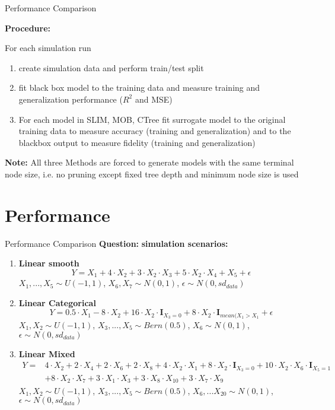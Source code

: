 \documentclass[9pt, xcolor=table]{beamer}
\begin{document}
\begin{frame}{Performance Comparison}


\textbf{Procedure:} 

For each simulation run
\begin{enumerate}
    \item create simulation data and perform train/test split
    \item fit black box model to the training data and measure training and generalization performance ($R^2$ and MSE)
    \item For each model in SLIM, MOB, CTree fit surrogate model to the original training data to measure accuracy (training and generalization) and to the blackbox output to measure fidelity (training and generalization)
\end{enumerate}

\textbf{Note:} All three Methods are forced to generate models with the same terminal node size, i.e. no pruning except fixed tree depth and minimum node size is used

\end{frame}

\section{Performance}
\begin{frame}{Performance Comparison}
\textbf{Question:} 
\textbf{simulation scenarios:}
\begin{enumerate}
    \item \textbf{Linear smooth} $$ Y = X_1 + 4 \cdot X_2 + 3 \cdot X_2 \cdot X_3 + 5\cdot X_2\cdot X_4 + X_5 + \epsilon $$
    $X_1,..., X_5 \sim U(-1,1)$, $X_6, X_7 \sim N(0,1)$, $\epsilon \sim N(0, sd_{data})$
    
    \item \textbf{Linear Categorical} $$ Y =  0.5\cdot X_{1} - 8\cdot X_2 + 16\cdot X_2\cdot \mathbf{I}_{X_3 = 0} + 8\cdot X_2\cdot \mathbf{I}_{mean(X_1 > X_1} + \epsilon $$
    $X_1, X_2 \sim U(-1,1)$, $X_3, ..., X_5 \sim Bern(0.5)$, $X_6 \sim N(0,1)$,  $\epsilon \sim N(0, sd_{data})$
    
    \item \textbf{Linear Mixed} 
    \begin{align*}
    Y = & 4 \cdot X_2 + 2 \cdot X_4 + 2 \cdot X_6 + 2 \cdot X_8 + 4 \cdot X_2 \cdot X_1 + 8 \cdot X_2 \cdot \mathbf{I}_{X_3 = 0} + 10 \cdot X_2 \cdot X_6  \cdot \mathbf{I}_{X_5 = 1} \\
    & + 8 \cdot X_2 \cdot X_7 + 3 \cdot X_1 \cdot X_3 + 3 \cdot X_8 \cdot X_10 + 3 \cdot X_7 \cdot X_9     
    \end{align*}
    $X_1, X_2 \sim U(-1,1)$, $X_3, ..., X_5 \sim Bern(0.5)$, $X_6, ... X_20 \sim N(0,1)$,  $\epsilon \sim N(0, sd_{data})$
\end{enumerate}
    
\end{frame}
\end{document}
